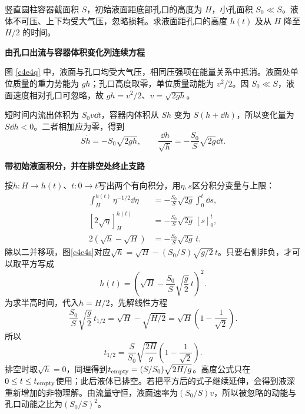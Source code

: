 \begin{question}
\begin{example}[容器泄流]
竖直圆柱容器截面积 $S$，初始液面距底部孔口的高度为 $H$，小孔面积 $S_0\ll S$。液体不可压、上下均受大气压，忽略损耗。求液面距孔口的高度 $h(t)$ 及从 $H$ 降至 $H/2$ 的时间。
\end{example}
\end{question}
\begin{solution}\textbf{由孔口出流与容器体积变化列连续方程}\par\nobreak
图 \ref{c4e4q} 中，液面与孔口均受大气压，相同压强项在能量关系中抵消。液面处单位质量的重力势能为 $gh$；孔口高度取零，单位质量动能为 $v^2/2$。因 $S_0\ll S$，液面速度相对孔口可忽略，故 $gh=v^2/2$、$v=\sqrt{2gh}$。

短时间内流出体积为 $S_0v\dd t$，容器内体积从 $Sh$ 变为 $S(h+\dd h)$，所以变化量为 $S\dd h<0$。二者相加应为零，得到
\[
 S\dot h=-S_0\sqrt{2gh},\qquad
 \frac{\dd h}{\sqrt h}=-\frac{S_0}{S}\sqrt{2g}\dd t.
\]



\par\medskip{}\noindent\textbf{带初始液面积分，并在排空处终止支路}\par\nobreak
按$h:H\to h(t)$、$t:0\to t$写出两个有向积分，用$\eta,s$区分积分变量与上限：
\begin{align*}
\int_H^{h(t)}\eta^{-1/2}\dd\eta
&=-\frac{S_0}{S}\sqrt{2g}\int_0^t\dd s,\\
[2\sqrt\eta]_H^{h(t)}
&=-\frac{S_0}{S}\sqrt{2g}\,[s]_0^t,\\
2(\sqrt h-\sqrt H)&=-\frac{S_0}{S}\sqrt{2g}\,t.
\end{align*}
除以二并移项，图\ref{c4e4s}对应$\sqrt h=\sqrt H-(S_0/S)\sqrt{g/2}\,t$。只要右侧非负，才可以取平方写成
\[
\boxed{h(t)=\left(\sqrt H-\frac{S_0}{S}\sqrt{\frac g2}\,t\right)^2}.
\]
为求半高时间，代入$h=H/2$，先解线性方程
\[
\frac{S_0}{S}\sqrt{\frac g2}\,t_{1/2}
=\sqrt H-\sqrt{H/2}
=\sqrt H\left(1-\frac1{\sqrt2}\right).
\]
所以
\[
t_{1/2}=\boxed{\frac S{S_0}\sqrt{\frac{2H}{g}}
\left(1-\frac1{\sqrt2}\right)}.
\]
排空时取$\sqrt h=0$，同理得到$t_{\rm empty}=(S/S_0)\sqrt{2H/g}$。高度公式只在$0\le t\le t_{\rm empty}$使用；此后液体已排空。若把平方后的式子继续延伸，会得到液深重新增加的非物理解。由流量守恒，液面速率为$(S_0/S)v$，所以被忽略的动能与孔口动能之比为$(S_0/S)^2$。
\end{solution}

